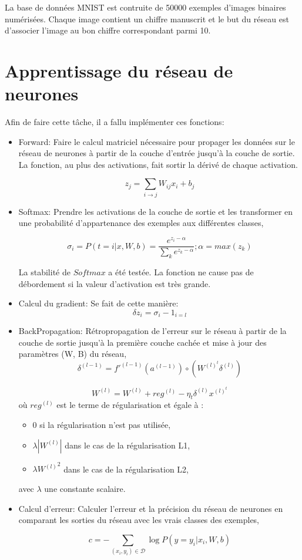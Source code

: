 \documentclass[a4paper,english,12pt]{article}
\begin{document}
La base de données MNIST est contruite de 50000 exemples d'images binaires numérisées. Chaque image contient un chiffre manuscrit et le but du réseau est d'associer l'image au bon chiffre correspondant parmi 10. 

\section{Apprentissage du réseau de neurones}
Afin de faire cette tâche, il a fallu implémenter ces fonctions:
\begin{itemize}
	\item Forward: Faire le calcul matriciel nécessaire pour propager les données sur le réseau de neurones à partir de la couche d'entrée jusqu'à la couche de sortie. La fonction, au plus des activations, fait sortir la dérivé de chaque activation.
	
	$$z_j = \sum_{i \rightarrow j} W_{ij} x_i + b_j$$
	
	\item Softmax: Prendre les activations de la couche de sortie et les transformer en une probabilité d'appartenance des exemples aux différentes classes,
	
	$$ \sigma_i = P(t=i|x,W,b) = \frac{e^{z_i-\alpha}}{\sum_k e^{z_k-\alpha}} ; \alpha=max(z_k)$$
	
	La stabilité de $Softmax$ a été testée. La fonction ne cause pas de débordement si la valeur d'activation est très grande.
	
	\item Calcul du gradient: Se fait de cette manière:	
		$$\delta z_i = \sigma_i - 1_{i=l}$$	
		
	\item BackPropagation: Rétropropagation de l'erreur sur le réseau à partir de la couche de sortie jusqu'à la première couche cachée et mise à jour des paramètres (W, B) du réseau,
		$$\delta^{(l-1)}=f'^{(l-1)}(a^{(l-1)}) \circ (W^{(l)^t}\delta^{(l)})$$
		
		$$W^{(l)}=W^{(l)}+reg^{(l)}-\eta_t \delta^{(l)} x^{(l)^t}$$
		où $reg^{(l)}$ est le terme de régularisation et égale à :
		\begin{itemize}
			\item $0$ si la régularisation n'est pas utilisée,
			\item $\lambda|W^{(l)}|$ dans le cas de la régularisation L1,
			\item $\lambda{W^{(l)}}^2$ dans le cas de la régularisation L2,
		\end{itemize}
		avec $\lambda$ une constante scalaire.
	\item Calcul d'erreur: Calculer l'erreur et la précision du réseau de neurones en comparant les sorties du réseau avec les vrais classes des exemples,
	
	$$c = - \sum_{(x_{i}, y_{i}) \in \mathcal{D}} \log P(y=y_{i}|x_{i},W,b)$$
	
\end{itemize}
\end{document}
